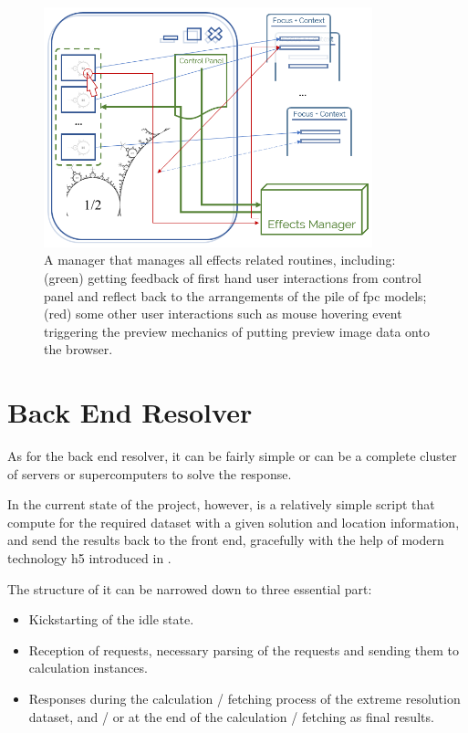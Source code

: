 \begin{figure}[H]
\centering
\includegraphics[width=0.85\textwidth,keepaspectratio]{Figures/Chapter3/effectsmanager.png}
\decoRule
\caption[Manager of Effects]{A manager that manages all effects related routines, including: (green) getting feedback of first hand user interactions from control panel and reflect back to the arrangements of the pile of \gls{fpc} models; (red) some other user interactions such as mouse hovering event triggering the preview mechanics of putting preview image data onto the browser.}
\label{fig:effectsmanager}
\end{figure}


\section{Back End Resolver}

As for the back end resolver, it can be fairly simple or can be a complete cluster of servers or supercomputers to solve the response.

In the current state of the project, however, is a relatively simple script that compute for the required dataset with a given solution and location information, and send the results back to the front end, gracefully with the help of modern technology \gls{h5} introduced in .

The structure of it can be narrowed down to three essential part: 

\begin{itemize}
    \item Kickstarting of the idle state.
    \item Reception of requests, necessary parsing of the requests and sending them to calculation instances.
    \item Responses during the calculation / fetching process of the extreme resolution dataset, and / or at the end of the calculation / fetching as final results.
\end{itemize}